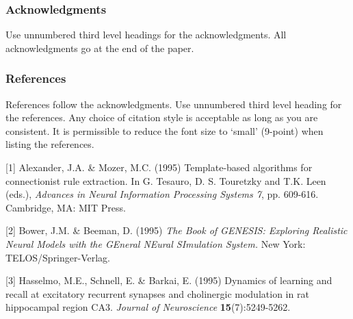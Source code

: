 \documentclass{article}
\begin{document}
\subsubsection*{Acknowledgments}

Use unnumbered third level headings for the acknowledgments. All
acknowledgments go at the end of the paper.

\subsubsection*{References}

References follow the acknowledgments. Use unnumbered third level heading for
the references. Any choice of citation style is acceptable as long as you are
consistent. It is permissible to reduce the font size to `small' (9-point) 
when listing the references.

\small{
[1] Alexander, J.A. \& Mozer, M.C. (1995) Template-based algorithms
for connectionist rule extraction. In G. Tesauro, D. S. Touretzky
and T.K. Leen (eds.), {\it Advances in Neural Information Processing
Systems 7}, pp. 609-616. Cambridge, MA: MIT Press.

[2] Bower, J.M. \& Beeman, D. (1995) {\it The Book of GENESIS: Exploring
Realistic Neural Models with the GEneral NEural SImulation System.}
New York: TELOS/Springer-Verlag.

[3] Hasselmo, M.E., Schnell, E. \& Barkai, E. (1995) Dynamics of learning
and recall at excitatory recurrent synapses and cholinergic modulation
in rat hippocampal region CA3. {\it Journal of Neuroscience}
{\bf 15}(7):5249-5262.
}
\end{document}
